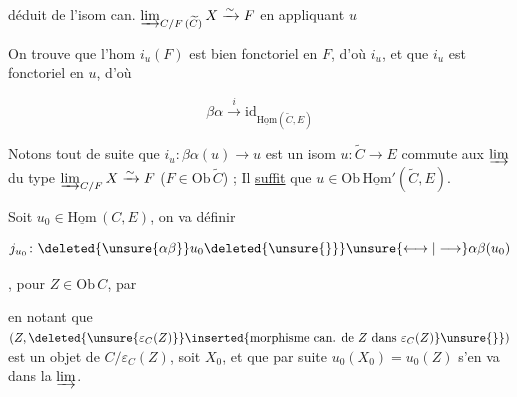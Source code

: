 
déduit de l'isom can. $\mathop{\varinjlim}_{C/F\,(\widetilde C)}X\xrightarrow{\sim} F$ en appliquant $u$

On trouve que l'hom $i_u(F)$ est bien fonctoriel en $F$, d'où $i_u$, et que $i_u$ est fonctoriel en $u$, d'où

\[
\boxed{\beta\alpha\xrightarrow{i}\mathrm{id}_{\underline{\mathrm{Hom}}(\widetilde C,E)}}
\]

Notons tout de suite que  $i_u\colon\beta\alpha(u)\longrightarrow u$ est un isom  $u\colon\widetilde C\longrightarrow E$ commute aux $\varinjlim$ du type $\varinjlim_{C/F}X\xrightarrow{\sim}F$ ($F\in\mathrm{Ob}\,\widetilde C$) ; Il \uline{suffit}  que $u\in\mathrm{Ob}\,\underline{\mathrm{Hom}}'(\widetilde C,E)$.

Soit $u_0\in\underline{\mathrm{Hom}}\,(C,E)$, on va définir

\[
j_{u_0}\colon\deleted{\unsure{\alpha\beta}}u_0\deleted{\unsure{\}}}\unsure{\longleftrightarrow|\longrightarrow}\alpha\beta(u_0)
\]

,  pour $Z\in\mathrm{Ob}\,C$, par


en notant que $(Z,\deleted{\unsure{\varepsilon_C(Z)}}\inserted{\text{morphisme can. de } Z\text{ dans }\varepsilon_C(Z)}\unsure{\}})$ est un objet de $C/\varepsilon_C(Z)$, soit $X_0$, et que par suite $u_0(X_0)=u_0(Z)$ s'en va dans la $\varinjlim$.

